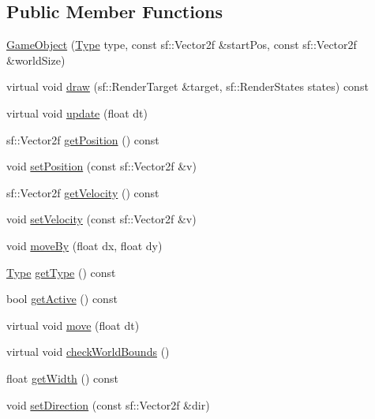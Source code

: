 \subsection*{Public Member Functions}
\begin{DoxyCompactItemize}
\item 
\hyperlink{class_game_object_a96b47f6288b4788338934be935d366ca}{Game\+Object} (\hyperlink{class_game_object_a4bf9e8f660e6a49f1b802c2aa9dd95af}{Type} type, const sf\+::\+Vector2f \&start\+Pos, const sf\+::\+Vector2f \&world\+Size)
\item 
virtual void \hyperlink{class_game_object_aa6d7650a920e2dd79b0125560faf3807}{draw} (sf\+::\+Render\+Target \&target, sf\+::\+Render\+States states) const
\item 
virtual void \hyperlink{class_game_object_a2fece397b6343682d639f8943f124d0e}{update} (float dt)
\item 
sf\+::\+Vector2f \hyperlink{class_game_object_a43a1f9dafe383a47a20abb51919e9e79}{get\+Position} () const
\item 
void \hyperlink{class_game_object_acdd88174ec97a4fae78b039762a39726}{set\+Position} (const sf\+::\+Vector2f \&v)
\item 
sf\+::\+Vector2f \hyperlink{class_game_object_aa96a0ccbe6b1ab87b643306e1f02806c}{get\+Velocity} () const
\item 
void \hyperlink{class_game_object_a6231b29f94ab90ff5cd3629b527caec1}{set\+Velocity} (const sf\+::\+Vector2f \&v)
\item 
void \hyperlink{class_game_object_aa8edcc1e4f7c0e3fbc0bafeb2ab38086}{move\+By} (float dx, float dy)
\item 
\hyperlink{class_game_object_a4bf9e8f660e6a49f1b802c2aa9dd95af}{Type} \hyperlink{class_game_object_a7d0bd9217fe8bf225ec815ab9e0f70f8}{get\+Type} () const
\item 
bool \hyperlink{class_game_object_a27ad4c159678dc9593e0c372e8b3f6df}{get\+Active} () const
\item 
virtual void \hyperlink{class_game_object_abebe08f70e334c52b8bf052b6ef8c6f3}{move} (float dt)
\item 
virtual void \hyperlink{class_game_object_a07bcaf0d87bd507f0a6e98abebd70e53}{check\+World\+Bounds} ()
\item 
float \hyperlink{class_game_object_a665147ee46e9b62442b2d6b9835c4dd4}{get\+Width} () const
\item 
void \hyperlink{class_game_object_a82170ca0b119ea4096a939fd6f7c937e}{set\+Direction} (const sf\+::\+Vector2f \&dir)
\item 

\end{DoxyCompactItemize}
